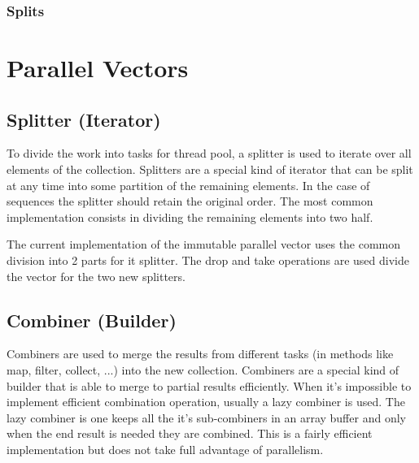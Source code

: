 
\subsubsection{Splits}



\section{Parallel Vectors}


\subsection{Splitter (Iterator)}
To divide the work into tasks for thread pool, a splitter is used to iterate over all elements of the collection. Splitters are a special kind of iterator that can be split at any time into some partition of the remaining elements. In the case of sequences the splitter should retain the original order. The most common implementation consists in dividing the remaining elements into two half. 

The current implementation of the immutable parallel  vector \cite{scalaParVector211}  uses the common division into 2 parts for it splitter. The drop and take operations are used divide the vector for the two new splitters.


\subsection{Combiner (Builder)}
Combiners are used to merge the results from different tasks (in methods like map, filter, collect, ...) into the new collection. Combiners are a special kind of builder that is able to merge to partial results efficiently. When it's impossible to implement efficient combination operation, usually a lazy combiner is used. The lazy combiner is one keeps all the it's sub-combiners in an array buffer and only when the end result is needed they are combined. This is a fairly efficient implementation but does not take full advantage of parallelism. 

